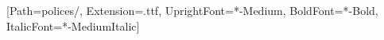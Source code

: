 %

\usepackage{tikz}
\usepackage{eso-pic}

%

\newfontfamily{}[Path=polices/, Extension=.ttf,
  UprightFont=*-Medium, BoldFont=*-Bold, ItalicFont=*-MediumItalic]

%
%
\newcommand{\korpDICIONARIO}{0.11217\paperwidth}   %
\newcommand{\korpSUBTITOLO} {0.06875\paperwidth}   %
\newcommand{\korpIDO}       {0.36908\paperwidth}   %
\newcommand{\korpNOMO}      {0.05247\paperwidth}   %

